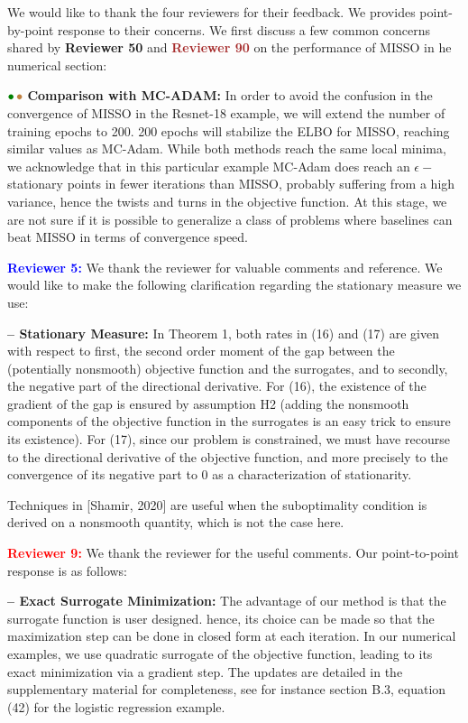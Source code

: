 \documentclass{article}
\begin{document}
We would like to thank the four reviewers for their feedback. We provides point-by-point response to their concerns.
We first discuss a few common concerns shared by \textbf{\textcolor{green!50!black}{Reviewer 50}} and \textbf{\textcolor{brown}{Reviewer 90}} on the performance of MISSO in he numerical section:

${\color{green!50!black}\bullet}\!~{\color{brown}\bullet}$ \textbf{Comparison with MC-ADAM:} 
In order to avoid the confusion in the convergence of MISSO in the Resnet-18 example, we will extend the number of training epochs to 200.
200 epochs will stabilize the ELBO for MISSO, reaching similar values as MC-Adam.
While both methods reach the same local minima, we acknowledge that in this particular example MC-Adam does reach an $\epsilon-$stationary points in fewer iterations than MISSO, probably suffering from a high variance, hence the twists and turns in the objective function.
At this stage, we are not sure if it is possible to generalize a class of problems where baselines can beat MISSO in terms of convergence speed.

\medskip
\textbf{\textcolor{blue}{Reviewer 5:}} We thank the reviewer for valuable comments and reference. We would like to make the following clarification regarding the stationary measure we use: 

\textbf{-- Stationary Measure:} In Theorem 1, both rates in (16) and (17) are given with respect to first, the second order moment of the gap between the (potentially nonsmooth) objective function and the surrogates, and to secondly, the negative part of the directional derivative.
For (16), the existence of the gradient of the gap is ensured by assumption H2 (adding the nonsmooth components of the objective function in the surrogates is an easy trick to ensure its existence).
For (17), since our problem is constrained, we must have recourse to the directional derivative of the objective function, and more precisely to the convergence of its negative part to $0$ as a characterization of stationarity.

Techniques in [Shamir, 2020] are useful when the suboptimality condition is derived on a nonsmooth quantity, which is not the case here.


\medskip
\textbf{\textcolor{red}{Reviewer 9:}} We thank the reviewer for the useful comments. Our point-to-point response is as follows: 

\textbf{-- Exact Surrogate Minimization:} 
The advantage of our method is that the surrogate function is user designed.
hence, its choice can be made so that the maximization step can be done in closed form at each iteration.
In our numerical examples, we use quadratic surrogate of the objective function, leading to its exact minimization via a gradient step.
The updates are detailed in the supplementary material for completeness, see for instance section B.3, equation (42) for the logistic regression example.
\end{document}
